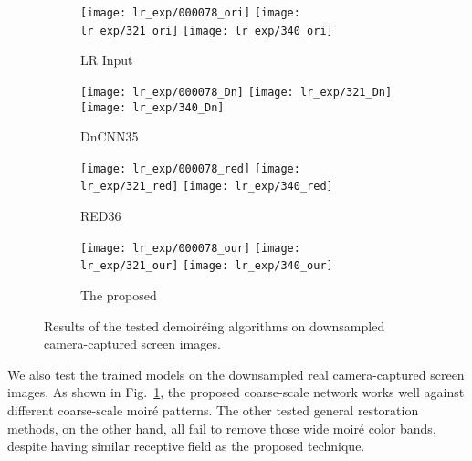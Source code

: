 \documentclass[10pt,twocolumn,letterpaper]{article}
\begin{document}
\begin{figure}[t]
  \begin{subfigure}{0.98\linewidth}
    \centering
    \texttt{[image: lr\_exp/000078\_ori]}
    \texttt{[image: lr\_exp/321\_ori]}
    \texttt{[image: lr\_exp/340\_ori]}
    \caption{LR Input}
  \end{subfigure}
  \begin{subfigure}{0.98\linewidth}
    \centering
    \texttt{[image: lr\_exp/000078\_Dn]}
    \texttt{[image: lr\_exp/321\_Dn]}
    \texttt{[image: lr\_exp/340\_Dn]}
    \caption{DnCNN35}
  \end{subfigure}
  \begin{subfigure}{0.98\linewidth}
    \centering
    \texttt{[image: lr\_exp/000078\_red]}
    \texttt{[image: lr\_exp/321\_red]}
    \texttt{[image: lr\_exp/340\_red]}
    \caption{RED36}
  \end{subfigure}
  \begin{subfigure}{0.98\linewidth}
    \centering
    \texttt{[image: lr\_exp/000078\_our]}
    \texttt{[image: lr\_exp/321\_our]}
    \texttt{[image: lr\_exp/340\_our]}
    \caption{The proposed}
  \end{subfigure}
  \caption{Results of the tested demoir\'eing algorithms on
    downsampled camera-captured screen images.}
  \label{fig:lr_exp}
\end{figure}

We also test the trained models on the downsampled real
camera-captured screen images.  As shown in Fig.~\ref{fig:lr_exp}, the
proposed coarse-scale network works well against different
coarse-scale moir\'e patterns.  The other tested general restoration
methods, on the other hand, all fail to remove those wide moir\'e
color bands, despite having similar receptive field as the proposed
technique.

\begin{table}[t]
  \centering
  \caption{Average PSNR and SSIM for synthetic data in high-resolution space.}
  \label{tab:psnr}
\end{table}
\end{document}

